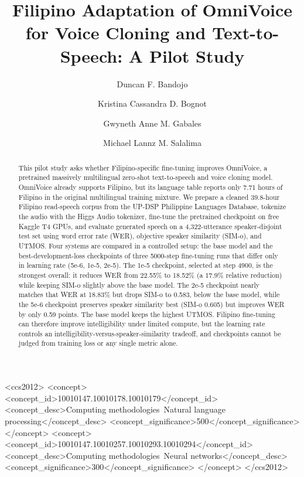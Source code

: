 \documentclass[sigconf,nonacm]{acmart}
\begin{document}
\title{Filipino Adaptation of OmniVoice for Voice Cloning and Text-to-Speech: A Pilot Study}

\author{Duncan F. Bandojo}
\author{Kristina Cassandra D. Bognot}
\author{Gwyneth Anne M. Gabales}
\author{Michael Lannz M. Salalima}

\renewcommand{\shortauthors}{Bandojo et al.}

\begin{abstract}
This pilot study asks whether Filipino-specific fine-tuning improves OmniVoice, a pretrained massively multilingual zero-shot text-to-speech and voice cloning model. OmniVoice already supports Filipino, but its language table reports only 7.71 hours of Filipino in the original multilingual training mixture. We prepare a cleaned 39.8-hour Filipino read-speech corpus from the UP-DSP Philippine Languages Database, tokenize the audio with the Higgs Audio tokenizer, fine-tune the pretrained checkpoint on free Kaggle T4 GPUs, and evaluate generated speech on a 4,322-utterance speaker-disjoint test set using word error rate (WER), objective speaker similarity (SIM-o), and UTMOS. Four systems are compared in a controlled setup: the base model and the best-development-loss checkpoints of three 5000-step fine-tuning runs that differ only in learning rate (5e-6, 1e-5, 2e-5). The 1e-5 checkpoint, selected at step 4900, is the strongest overall: it reduces WER from 22.55\% to 18.52\% (a 17.9\% relative reduction) while keeping SIM-o slightly above the base model. The 2e-5 checkpoint nearly matches that WER at 18.83\% but drops SIM-o to 0.583, below the base model, while the 5e-6 checkpoint preserves speaker similarity best (SIM-o 0.605) but improves WER by only 0.59 points. The base model keeps the highest UTMOS. Filipino fine-tuning can therefore improve intelligibility under limited compute, but the learning rate controls an intelligibility-versus-speaker-similarity tradeoff, and checkpoints cannot be judged from training loss or any single metric alone.
\end{abstract}

\begin{CCSXML}
<ccs2012>
<concept>
<concept_id>10010147.10010178.10010179</concept_id>
<concept_desc>Computing methodologies~Natural language processing</concept_desc>
<concept_significance>500</concept_significance>
</concept>
<concept>
<concept_id>10010147.10010257.10010293.10010294</concept_id>
<concept_desc>Computing methodologies~Neural networks</concept_desc>
<concept_significance>300</concept_significance>
</concept>
</ccs2012>
\end{CCSXML}
\end{document}
